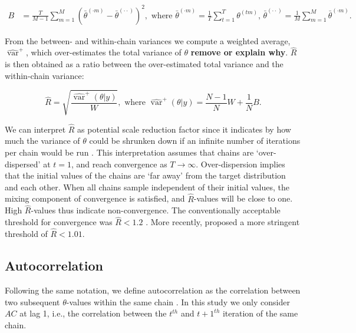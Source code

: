 \documentclass[Royal,times,sageh]{sagej}
\begin{document}
\begin{align*}
B&=\frac{T}{M-1} \sum_{m=1}^{M}\left(\bar{\theta}^{(\cdot m)}-\bar{\theta}^{(\cdot \cdot)}\right)^{2}, \text { where } \bar{\theta}^{(\cdot m)}=\frac{1}{T} \sum_{t=1}^{T} \theta^{(t m)} \text{, } \bar{\theta}^{(\cdot \cdot)}=\frac{1}{M} \sum_{m=1}^{M} \bar{\theta}^{(\cdot m)}. 
\end{align*}

From the between- and within-chain variances we compute a weighted
average, \(\widehat{\operatorname{var}}^{+}\), which over-estimates the
total variance of \(\theta\) \textbf{remove or explain why}.
\(\widehat{R}\) is then obtained as a ratio between the over-estimated
total variance and the within-chain variance:

\begin{equation*}
\widehat{R}=\sqrt{\frac{\widehat{\operatorname{var}}^{+}(\theta | y)}{W}},
\text{ where } \widehat{\operatorname{var}}^{+}(\theta | y)=\frac{N-1}{N} W+\frac{1}{N} B.
\end{equation*}

We can interpret \(\widehat{R}\) as potential scale reduction factor
since it indicates by how much the variance of \(\theta\) could be
shrunken down if an infinite number of iterations per chain would be run
\citep{gelm92}. This interpretation assumes that chains are
`over-dispersed' at \(t=1\), and reach convergence as \(T \to \infty\).
Over-dispersion implies that the initial values of the chains are `far
away' from the target distribution and each other. When all chains
sample independent of their initial values, the mixing component of
convergence is satisfied, and \(\widehat{R}\)-values will be close to
one. High \(\widehat{R}\)-values thus indicate non-convergence. The
conventionally acceptable threshold for convergence was
\(\widehat{R} < 1.2\) \citep{gelm92}. More recently, \citet{veht19}
proposed a more stringent threshold of \(\widehat{R} < 1.01\).

\hypertarget{autocorrelation}{%
\subsection{Autocorrelation}\label{autocorrelation}}

Following the same notation, we define autocorrelation as the
correlation between two subsequent \(\theta\)-values within the same
chain \citep[p.~147]{lync07}. In this study we only consider \(AC\) at
lag 1, i.e., the correlation between the \(t^{th}\) and \(t+1^{th}\)
iteration of the same chain.
\end{document}
